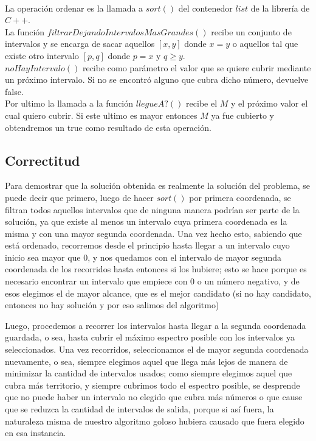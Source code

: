 \documentclass[a4paper, 10pt]{article}
\begin{document}
\\
La operación ordenar es la llamada a $sort()$ del contenedor $list$ de la librería de $C++$.\\
La función $filtrarDejandoIntervalosMasGrandes()$ recibe un conjunto de intervalos y se encarga de sacar aquellos
$[x,y]$ donde $x = y$ o aquellos tal que existe otro intervalo $[p,q]$ donde $p = x$ y $q \geq y$.\\
$noHayIntervalo()$ recibe como parámetro el valor que se quiere cubrir mediante un próximo intervalo. Si no se encontró
alguno que cubra dicho número, devuelve false.\\
Por ultimo la llamada a la función $llegueA?()$ recibe el $M$ y el próximo valor el cual quiero cubrir. Si este ultimo es
mayor entonces $M$ ya fue cubierto y obtendremos un true como resultado de esta operación.



\subsection{Correctitud}

Para demostrar que la solución obtenida es realmente la solución del problema, se puede decir que primero, luego de hacer $sort()$ por primera coordenada, se filtran todos aquellos intervalos que de ninguna manera podrían ser parte de la solución, ya que existe al menos un intervalo cuya primera coordenada es la misma y con una mayor segunda coordenada. Una vez hecho esto, sabiendo que está ordenado, recorremos desde el principio hasta llegar a un intervalo cuyo inicio sea mayor que 0, y nos quedamos con el intervalo de mayor segunda coordenada de los recorridos hasta entonces si los hubiere; esto se hace porque es necesario encontrar un intervalo que empiece con 0 o un número negativo, y de esos elegimos el de mayor alcance, que es el mejor candidato (si no hay candidato, entonces no hay solución y por eso salimos del algoritmo)

Luego, procedemos a recorrer los intervalos hasta llegar a la segunda coordenada guardada, o sea, hasta cubrir el máximo espectro posible con los intervalos ya seleccionados. Una vez recorridos, seleccionamos el de mayor segunda coordenada nuevamente, o sea, siempre elegimos aquel que llega más lejos de manera de minimizar la cantidad de intervalos usados; como siempre elegimos aquel que cubra más territorio, y siempre cubrimos todo el espectro posible, se desprende que no puede haber un intervalo no elegido que cubra más números o que cause que se reduzca la cantidad de intervalos de salida, porque si así fuera, la naturaleza misma de nuestro algoritmo goloso hubiera causado que fuera elegido en esa instancia.
\end{document}
